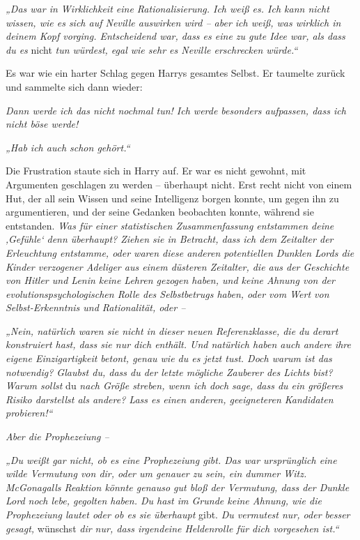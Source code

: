\emph{„Das war in Wirklichkeit eine Rationalisierung. Ich weiß es. Ich kann nicht wissen, wie es sich auf Neville auswirken wird – aber ich weiß, was wirklich in deinem Kopf vorging. Entscheidend war, dass es eine zu gute Idee war, als dass du es }nicht\emph{ tun würdest, egal wie sehr es Neville erschrecken würde.“} 

Es war wie ein harter Schlag gegen Harrys gesamtes Selbst. Er taumelte zurück und sammelte sich dann wieder:

\emph{Dann werde ich das nicht nochmal tun! Ich werde besonders aufpassen, dass ich nicht böse werde! }

\emph{„Hab ich auch schon gehört.“} 

Die Frustration staute sich in Harry auf. Er war es nicht gewohnt, mit Argumenten geschlagen zu werden – überhaupt nicht. Erst recht nicht von einem Hut, der all sein Wissen und seine Intelligenz borgen konnte, um gegen ihn zu argumentieren, und der seine Gedanken beobachten konnte, während sie entstanden. \emph{Was für einer statistischen Zusammenfassung entstammen deine ‚Gefühle‘ denn überhaupt? Ziehen sie in Betracht, dass ich dem Zeitalter der Erleuchtung entstamme, oder waren diese anderen potentiellen Dunklen Lords die Kinder verzogener Adeliger aus einem düsteren Zeitalter, die aus der Geschichte von Hitler und Lenin keine Lehren gezogen haben, und keine Ahnung von der evolutionspsychologischen Rolle des Selbstbetrugs haben, oder vom Wert von Selbst-Erkenntnis und Rationalität, oder – }

\emph{„Nein, natürlich waren sie nicht in dieser neuen Referenzklasse, die du derart konstruiert hast, dass sie nur dich enthält. Und natürlich haben auch andere ihre eigene Einzigartigkeit betont, genau wie du es jetzt tust. Doch warum ist das notwendig? Glaubst du, dass du der letzte mögliche Zauberer des Lichts bist? Warum sollst }du\emph{ nach Größe streben, wenn ich doch sage, dass du ein größeres Risiko darstellst als andere? Lass es einen anderen, geeigneteren Kandidaten probieren!“ }

\emph{Aber die Prophezeiung – }

\emph{„Du weißt gar nicht, ob es eine Prophezeiung gibt. Das war ursprünglich eine wilde Vermutung von dir, oder um genauer zu sein, ein dummer Witz. McGonagalls Reaktion könnte genauso gut bloß der Vermutung, dass der Dunkle Lord noch lebe, gegolten haben. Du hast im Grunde keine Ahnung, wie die Prophezeiung lautet oder ob es sie überhaupt }gibt.\emph{ Du vermutest nur, oder besser gesagt, }wünschst\emph{ dir nur, dass irgendeine Heldenrolle für dich vorgesehen ist.“ }

